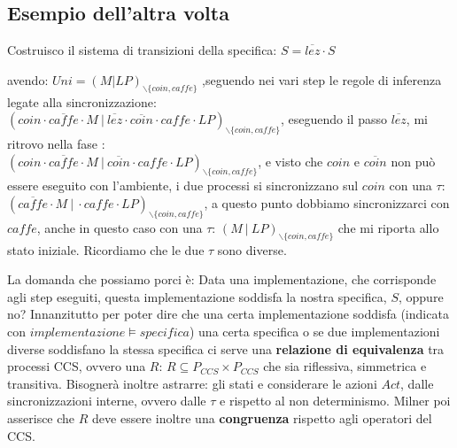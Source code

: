 \subsection{Esempio dell'altra volta}
Costruisco il sistema di transizioni della specifica: $S=\overline{lez}\cdot S$ 

\begin{center} 
\end{center} avendo: 
$\displaystyle Uni=(M|LP)_{\backslash\{ coin, caffe\}}$ ,seguendo nei vari step le regole di inferenza legate alla sincronizzazione: \\

$\displaystyle (coin\cdot \overline{caffe}\cdot M \ | \ \overline{lez}\cdot\overline{coin}\cdot caffe\cdot LP)_{\backslash\{ coin, caffe\}}$, eseguendo il passo $\overline{lez}$, mi ritrovo nella fase : \\

$\displaystyle (coin\cdot \overline{caffe}\cdot M \ | \ \overline{coin}\cdot caffe\cdot LP)_{\backslash\{ coin, caffe\}}$, e visto che $coin$ e $\overline{coin}$ non può essere eseguito con l'ambiente, i due processi si sincronizzano sul $coin$ con una $\tau$: \\

$\displaystyle (\overline{caffe}\cdot M \ | \ \cdot caffe\cdot LP)_{\backslash\{ coin, caffe\}}$, a questo punto dobbiamo sincronizzarci con $caffe$, anche in questo caso con una $\tau$: 
$\displaystyle ( M \ | \  LP)_{\backslash\{ coin, caffe\}}$ che mi riporta allo stato iniziale. Ricordiamo che le due $\tau$ sono diverse.

La domanda che possiamo porci è: Data una implementazione, che corrisponde agli step eseguiti, questa implementazione soddisfa la nostra specifica, $S$, oppure no?
Innanzitutto per poter dire che una certa implementazione soddisfa (indicata con $implementazione \models specifica$) una certa specifica o se due implementazioni diverse soddisfano la stessa specifica ci serve una \textbf{relazione di equivalenza} tra processi CCS, ovvero una $R$: $R\subseteq P_{CCS}\times P_{CCS}$ che sia riflessiva, simmetrica e transitiva.
Bisognerà inoltre astrarre: gli stati e considerare le azioni $Act$, dalle sincronizzazioni interne, ovvero dalle $\tau$ e  rispetto al non determinismo. Milner poi asserisce che $R$ deve essere inoltre una \textbf{congruenza} rispetto agli operatori del CCS.\\

